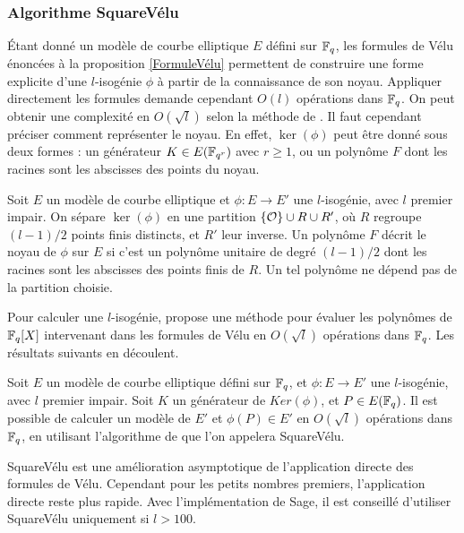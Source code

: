 \subsubsection{Algorithme SquareVélu}\label{SECTION squareVélu}

Étant donné un modèle de courbe elliptique $E$ défini sur $\mathbb{F}_{q}$, les formules de Vélu énoncées à la proposition \ref{FormuleVélu} permettent de construire une forme explicite d'une $l$-isogénie $\phi$ à partir de la connaissance de son noyau. Appliquer directement les formules demande cependant $O(l)$ opérations dans $\mathbb{F}_{q}$. On peut obtenir une complexité en $O(\sqrt{l})$ selon la méthode de \cite{Velusqrt}. Il faut cependant préciser comment représenter le noyau. En effet, $\ker(\phi)$ peut être donné sous deux formes : un générateur $K\in E(\mathbb{F}_{q^{r}})$ avec $r \geq 1$, ou un polynôme $F$ dont les racines sont les abscisses des points du noyau. 

\begin{Def}
	Soit $E$ un modèle de courbe elliptique et $\phi : E\rightarrow E'$ une $l$-isogénie, avec $l$ premier impair. On sépare $\ker(\phi)$ en une partition $\left\lbrace \mathcal{O} \right\rbrace \cup R\cup R'$, où $R$ regroupe $(l-1)/2$ points finis distincts, et $R'$ leur inverse. Un polynôme $F$ décrit le noyau de $\phi$ sur $E$ si c'est un polynôme unitaire de degré $(l-1)/2$ dont les racines sont les abscisses des points finis de $R$. Un tel polynôme ne dépend pas de la partition choisie. 
\end{Def}

Pour calculer une $l$-isogénie, \cite{Velusqrt} propose une méthode pour évaluer les polynômes de $\mathbb{F}_{q}[X]$ intervenant dans les formules de Vélu en $O(\sqrt{l})$ opérations dans $\mathbb{F}_{q}$. Les résultats suivants en découlent.

\begin{Prop}
	Soit $E$ un modèle de courbe elliptique défini sur $\mathbb{F}_{q}$, et $\phi : E\rightarrow E'$ une $l$-isogénie, avec $l$ premier impair. Soit $K$ un générateur de $Ker(\phi)$, et $P\in E(\mathbb{F}_{q})$. Il est possible de calculer un modèle de $E'$ et $\phi(P)\in E'$ en $O(\sqrt{l})$ opérations dans $\mathbb{F}_{q}$, en utilisant l'algorithme de \cite{Velusqrt} que l'on appelera SquareVélu.
\end{Prop}

\begin{Rem}
	SquareVélu est une amélioration asymptotique de l'application directe des formules de Vélu. Cependant pour les petits nombres premiers, l'application directe reste plus rapide. Avec l’implémentation de Sage, il est conseillé d'utiliser SquareVélu uniquement si $l > 100$. 
\end{Rem}

